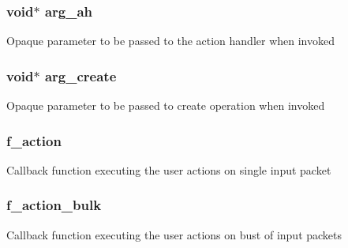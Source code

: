 \subsubsection[{arg\+\_\+ah}]{\setlength{\rightskip}{0pt plus 5cm}void$\ast$ arg\+\_\+ah}\label{structrte__pipeline__port__out__params_adfcedab79c75f0129bd5382cf3d48b13}
Opaque parameter to be passed to the action handler when invoked \hypertarget{structrte__pipeline__port__out__params_ab34a217f23d1f5a27ae00e3fbbba445c}{}
\subsubsection[{arg\+\_\+create}]{\setlength{\rightskip}{0pt plus 5cm}void$\ast$ arg\+\_\+create}\label{structrte__pipeline__port__out__params_ab34a217f23d1f5a27ae00e3fbbba445c}
Opaque parameter to be passed to create operation when invoked \hypertarget{structrte__pipeline__port__out__params_aa55f9c3325a2f2a5e9539de6e63235e2}{}
\subsubsection[{f\+\_\+action}]{ f\+\_\+action}\label{structrte__pipeline__port__out__params_aa55f9c3325a2f2a5e9539de6e63235e2}
Callback function executing the user actions on single input packet \hypertarget{structrte__pipeline__port__out__params_ab7cce8b3a5b983a8dcedc32acb8d97be}{}
\subsubsection[{f\+\_\+action\+\_\+bulk}]{ f\+\_\+action\+\_\+bulk}\label{structrte__pipeline__port__out__params_ab7cce8b3a5b983a8dcedc32acb8d97be}
Callback function executing the user actions on bust of input packets \hypertarget{structrte__pipeline__port__out__params_acbbf5f18df1ca93f322f75ad3dae5e52}{}
